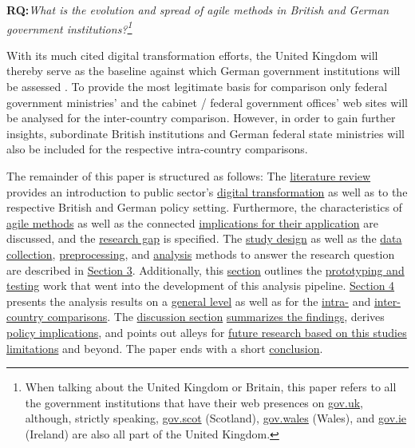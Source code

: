 \begin{addmargin}[2em]{2em}%
\textbf{RQ:}\textit{What is the evolution and spread of agile methods in British and German government institutions?\footnote{When talking about the United Kingdom or Britain, this paper refers to all the government institutions that have their web presences on \href{https://gov.uk}{gov.uk}, although, strictly speaking, \href{https://gov.scot}{gov.scot} (Scotland), \href{https://gov.wales}{gov.wales} (Wales), and  \href{https://gov.ie}{gov.ie} (Ireland) are also all part of the United Kingdom.}}\label{RQ1}
\end{addmargin}\par 

With its much cited digital transformation efforts, the United Kingdom will thereby serve as the baseline against which German government institutions will be assessed \parencite{Sivarajah2014, Clarke2019}. To provide the most legitimate basis for comparison only federal government ministries' and the cabinet / federal government offices' web sites will be analysed for the inter-country comparison. However, in order to gain further insights, subordinate British institutions and German federal state ministries will also be included for the respective intra-country comparisons.

The remainder of this paper is structured as follows: The \hyperref[Literature Review]{literature review} provides an introduction to public sector's \hyperref[Digital Transformation]{digital transformation} as well as to the respective British and German policy setting. Furthermore, the characteristics of \hyperref[Agile Methods]{agile methods} as well as the connected \hyperref[Benefits, Challenges, and Conditions]{implications for their application} are discussed, and the \hyperref[Research Gap]{research gap} is specified. The 
\hyperref[Study Design]{study design} as well as the \hyperref[Data Collection]{data collection}, \hyperref[Data Preprocessing]{preprocessing}, and \hyperref[Data Analysis and Visualisation]{analysis} methods to answer the research question are described in \hyperref[Methods]{Section 3}. Additionally, this \hyperref[Methods]{section} outlines the \hyperref[Prototyping and Testing]{prototyping and testing} work that went into the development of this analysis pipeline. \hyperref[Analysis]{Section 4} presents the analysis results on a \hyperref[General Level]{general level} as well as for the \hyperref[Intra-Country Comparison]{intra-} and \hyperref[Inter-Country Comparison]{inter-country comparisons}. The \hyperref[Discussion]{discussion section} \hyperref[Summary of Findings]{summarizes the findings}, derives \hyperref[Policy Implications]{policy implications}, and points out alleys for \hyperref[Limitations and Future Work]{future research based on this studies limitations} and beyond. The paper ends with a short \hyperref[Conclusion]{conclusion}.



